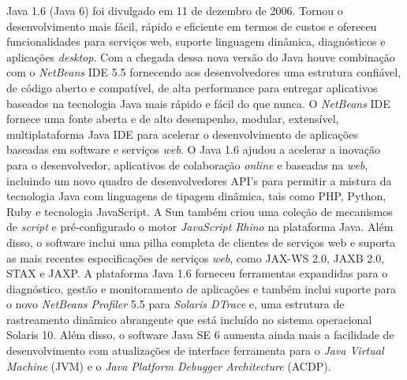 Java 1.6 (Java 6) foi divulgado em 11 de dezembro de 2006. Tornou o desenvolvimento mais fácil, rápido e eficiente em termos de custos e ofereceu funcionalidades para serviços web, suporte linguagem dinâmica, diagnósticos e aplicações {\it desktop}. Com a chegada dessa nova versão do Java houve combinação com o {\it NetBeans} IDE 5.5 fornecendo aos desenvolvedores uma estrutura confiável, de código aberto e compatível, de alta performance para entregar aplicativos baseados na tecnologia Java mais rápido e fácil do que nunca. O {\it NetBeans} IDE fornece uma fonte aberta e de alto desempenho, modular, extensível, multiplataforma Java IDE para acelerar o desenvolvimento de aplicações baseadas em software e serviços {\it web}. O Java 1.6 ajudou a acelerar a inovação para o desenvolvedor, aplicativos de colaboração {\it online} e baseadas na {\it web}, incluindo um novo quadro de desenvolvedores \acs{API}'s para permitir a mistura da tecnologia Java com linguagens de tipagem dinâmica, tais como PHP, Python, Ruby e tecnologia JavaScript. A Sun também criou uma coleção de mecanismos de {\it script} e pré-configurado o motor {\it JavaScript Rhino} na plataforma Java. Além disso, o software inclui uma pilha completa de clientes de serviços web e suporta as mais recentes especificações de serviços {\it web}, como \acs{JAX-WS} 2.0, \acs{JAXB} 2.0, \acs{STAX} e \acs{JAXP}. A plataforma Java 1.6 forneceu ferramentas expandidas para o diagnóstico, gestão e monitoramento de aplicações e também inclui suporte para o novo {\it NetBeans Profiler} 5.5 para {\it Solaris DTrace } e, uma estrutura de rastreamento dinâmico abrangente que está incluído no sistema operacional Solaris 10. Além disso, o software Java SE 6 aumenta ainda mais a facilidade de desenvolvimento com atualizações de interface ferramenta para o {\it Java Virtual Machine} (\acs{JVM}) e o {\it Java Platform Debugger Architecture} (\acs{ACDP}).

